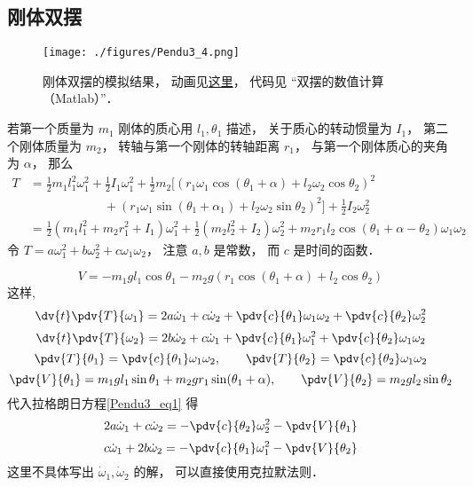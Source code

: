 \subsection{刚体双摆}

\begin{figure}[ht]
\centering
\texttt{[image: ./figures/Pendu3\_4.png]}
\caption{刚体双摆的模拟结果， 动画见\href{https://wuli.wiki/apps/RigDbPend.html}{这里}， 代码见 “双摆的数值计算（Matlab）”．} \label{Pendu3_fig4}
\end{figure}
若第一个质量为 $m_1$ 刚体的质心用 $l_1,\theta_1$ 描述， 关于质心的转动惯量为 $I_1$， 第二个刚体质量为 $m_2$， 转轴与第一个刚体的转轴距离 $r_1$， 与第一个刚体质心的夹角为 $\alpha$， 那么
\begin{equation}
\begin{aligned}
T &= \frac{1}{2}m_1 l_1^2 \omega_1^2 + \frac{1}{2}I_1 \omega_1^2
 + \frac{1}{2}m_2[(r_1\omega_1\cos(\theta_1 + \alpha) + l_2\omega_2\cos\theta_2)^2\\
&\qquad \qquad \qquad+ (r_1\omega_1\sin(\theta_1+\alpha_1) + l_2\omega_2\sin\theta_2)^2] + \frac{1}{2}I_2\omega_2^2\\
&= \frac{1}{2}(m_1l_1^2 + m_2r_1^2 + I_1)\omega_1^2 + \frac{1}{2}(m_2l_2^2 + I_2)\omega_2^2 + m_2r_1l_2\cos(\theta_1+\alpha-\theta_2)\omega_1\omega_2
\end{aligned}
\end{equation}
令 $T = a\omega_1^2 + b\omega_2^2 + c\omega_1\omega_2$， 注意 $a,b$ 是常数， 而 $c$ 是时间的函数．

\begin{equation}  
V = -m_1 g l_1 \cos \theta_1 - m_2 g (r_1\cos(\theta_1 + \alpha) + l_2 \cos \theta_2)
\end{equation}
这样,
\begin{equation}
\dv{t}\pdv{T}{\omega_1} = 2a\dot\omega_1 + c\dot\omega_2 + \pdv{c}{\theta_1}\omega_1\omega_2 + \pdv{c}{\theta_2}\omega_2^2
\end{equation}
\begin{equation}
\dv{t}\pdv{T}{\omega_2} = 2b\dot\omega_2 + c\dot\omega_1 + \pdv{c}{\theta_1}\omega_1^2 + \pdv{c}{\theta_2}\omega_1\omega_2
\end{equation}
\begin{equation}
\pdv{T}{\theta_1} = \pdv{c}{\theta_1}\omega_1\omega_2, \qquad
\pdv{T}{\theta_2} = \pdv{c}{\theta_2}\omega_1\omega_2
\end{equation}
\begin{equation}
\pdv{V}{\theta_1} = m_1gl_1\sin\theta_1 + m_2gr_1\sin(\theta_1+\alpha), \qquad
\pdv{V}{\theta_2} = m_2gl_2\sin\theta_2
\end{equation}
代入拉格朗日方程\autoref{Pendu3_eq1} 得
\begin{equation}
2a\dot\omega_1 + c\dot\omega_2 = -\pdv{c}{\theta_2}\omega_2^2 - \pdv{V}{\theta_1}
\end{equation}
\begin{equation}
c\dot\omega_1 + 2b\dot\omega_2 = -\pdv{c}{\theta_1}\omega_1^2 - \pdv{V}{\theta_2}
\end{equation}
这里不具体写出 $\dot\omega_1, \dot\omega_2$ 的解， 可以直接使用克拉默法则．


